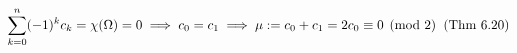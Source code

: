 \documentclass[preview]{standalone}
\begin{document}
\begin{align*}
\special{dvisvgm:raw <g id='unique000'>}\sum_{k=0}^n (-1)^k c_k = \chi(\Omega) = 0 \;\Longrightarrow\; c_0 = c_1 \;\Longrightarrow\; \mu := c_0 + c_1 = 2c_0 \equiv 0 \pmod{2}\;\;(\text{Thm 6.20})\special{dvisvgm:raw </g>}
\end{align*}
\end{document}

